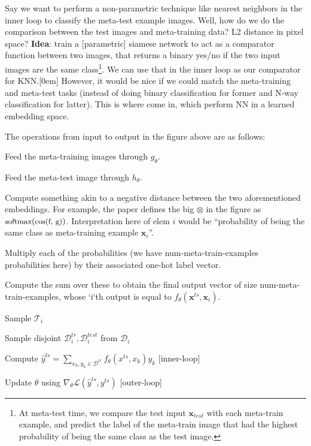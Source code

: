 \documentclass[11pt]{article}
\renewcommand\vec[2][]{\bm{#2}_{#1}}
\newcommand\task{\mathscr{T}}
\begin{document}
Say we want to perform a non-parametric technique like nearest neighbors in the inner loop to classify the meta-test example images. Well, how do we do the comparison between the test images and meta-training data? L2 distance in pixel space? \textbf{Idea}: train a [parametric] siamese network to act as a comparator function between two images, that returns a binary yes/no if the two input images are the same class\footnote{At meta-test time, we compare the test input $\vec[test]{x}$ with each meta-train example, and predict the label of the meta-train image that had the highest probability of being the same class as the test image.}. We can use that in the inner loop as our comparator for KNN.[0em] However, it would be nice if we could match the meta-training and meta-test tasks (instead of doing binary classification for former and N-way classification for latter). This is where  come in, which perform NN in a learned embedding space. 


The operations from input to output in the figure above are as follows:
\begin{compactenum}
	\item Feed the meta-training images through $g_{\theta}$. 
	\item Feed the meta-test image through $h_{\theta}$. 
	\item Compute something akin to a negative distance between the two aforementioned embeddings. For example, the paper defines the big $\otimes$ in the figure as ${\small\text{softmax}}({\small\text{cos(f, g)}})$. Interpretation here of elem $i$ would be ``probability of being the same class as meta-training example $\vec[i]{x}$''. 
	\item Multiply each of the probabilities (we have num-meta-train-examples probabilities here) by their associated one-hot label vector. 
	\item Compute the sum over these to obtain the final output vector of size num-meta-train-examples, whose `i`th output is equal to $f_{\theta}(\vec{x}^{ts}, \vec[i]{x})$. 
\end{compactenum}

\begin{algorithm}
	\begin{compactenum}
		\item Sample $\task_i$
		\item Sample disjoint $\mathcal{D}_i^{tr}, \mathcal{D}_i^{test}$ from $\mathcal{D}_i$
		\item Compute $\hat{y}^{ts} = \sum_{x_k, y_k \in \mathcal{D}^{tr}} f_{\theta}(x^{ts}, x_k) y_k$  \scriptsize{[inner-loop]}
		\item Update $\theta$ using $\nabla_{\theta} \mathcal L ( \hat{y}^{ts}, y^{ts} )$  \scriptsize{[outer-loop]}
	\end{compactenum}
\end{algorithm}
\end{document}
